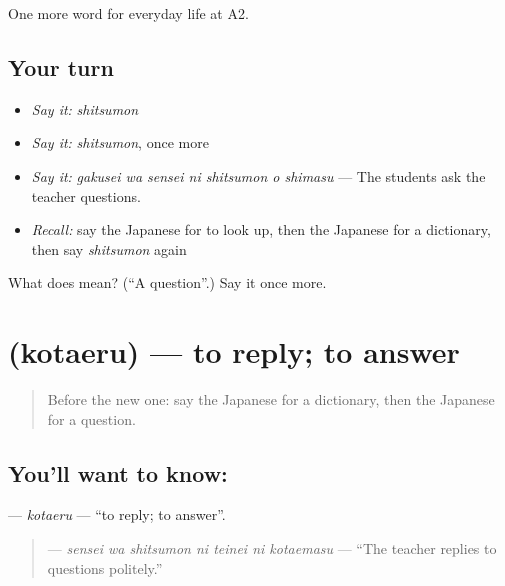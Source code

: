 \begin{grammarlens}[title={What you've built}]
One more word for everyday life at A2.
\end{grammarlens}

\subsection*{Your turn}
\begin{itemize}
\raggedright
  \item \emph{Say it:} \emph{shitsumon}
  \item \emph{Say it:} \emph{shitsumon}, once more
  \item \emph{Say it:} \emph{gakusei wa sensei ni shitsumon o shimasu} — The students ask the teacher questions.
  \item \emph{Recall:} say the Japanese for to look up, then the Japanese for a dictionary, then say \emph{shitsumon} again
\end{itemize}

\begin{tcolorbox}[breakable,colback=teal!4,colframe=teal!35!black,title={Before you move on}]
What does  mean? (\textquotedblleft{}A question\textquotedblright{}.) Say it once more.
\end{tcolorbox}
\section[\texorpdfstring{\ja{こたえる} (kotaeru)}{こたえる (kotaeru)}]{ (kotaeru) — to reply; to answer}

\label{lesson:JA-C226-kotaeru}



\begin{quote}
Before the new one: say the Japanese for a dictionary, then the Japanese for a question.
\end{quote}

\subsection*{You'll want to know: }
\textbf{} — \emph{kotaeru} — \textquotedblleft{}to reply; to answer\textquotedblright{}.

\begin{quote}
\textbf{   } — \emph{sensei wa shitsumon ni teinei ni kotaemasu} — \textquotedblleft{}The teacher replies to questions politely.\textquotedblright{}
\end{quote}

